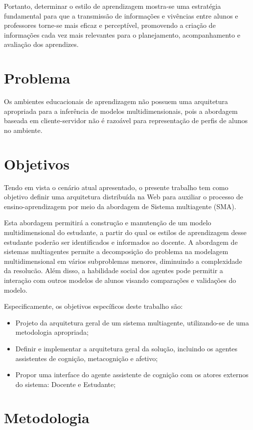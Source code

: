 Portanto, determinar o estilo de aprendizagem mostra-se uma estratégia fundamental para que a transmissão de informações e vivências entre alunos e professores torne-se mais eficaz e perceptível, promovendo a criação de informações cada vez mais relevantes para o planejamento, acompanhamento e avaliação dos aprendizes.


\section{Problema}
Os ambientes educacionais de aprendizagem não possuem uma arquitetura apropriada para a inferência de modelos multidimensionais, pois a abordagem baseada em cliente-servidor não é razoável para representação de perfis de alunos no ambiente.

\section{Objetivos}
Tendo em vista o cenário atual apresentado, o presente trabalho tem como objetivo definir uma arquitetura distribuída na Web para auxiliar o processo de ensino-aprendizagem por meio da abordagem de Sistema multiagente (SMA).

Esta abordagem permitirá a construção e manutenção de um modelo multidimensional do estudante, a partir do qual os estilos de aprendizagem desse estudante poderão ser identificados e informados ao docente. A abordagem de sistemas multiagentes permite a decomposição do problema na modelagem multidimensional em vários subproblemas menores, diminuindo a complexidade da resolucão. Além disso, a habilidade social dos agentes pode permitir a interação com outros modelos de alunos visando comparações e validações do modelo.

Especificamente, os objetivos específicos deste trabalho são:
\begin{itemize}
 	\item Projeto da arquitetura geral de um sistema multiagente, utilizando-se de uma metodologia apropriada;
	\item Definir e implementar a arquitetura geral da solução, incluindo os agentes assistentes de cognição, metacognição e afetivo;
	\item Propor uma interface do agente assistente de cognição com os atores externos do sistema: Docente e Estudante;
\end{itemize}

\section{Metodologia}

